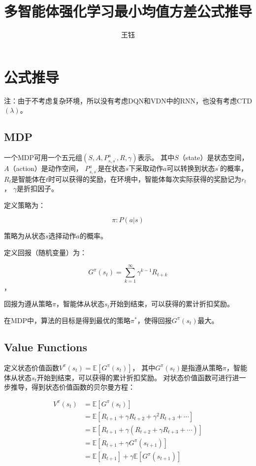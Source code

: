 \documentclass[UTF8]{ctexart}
\title{多智能体强化学习最小均值方差公式推导}
\begin{document}
\maketitle
\author{王钰}


\section{公式推导}

注：由于不考虑复杂环境，所以没有考虑DQN和VDN中的RNN，也没有考虑CTD$(\lambda)$。

\subsection{MDP}

一个MDP可用一个五元组$(S, A, P^a_{s, s^{\prime}}, R, \gamma)$表示。
其中$S$（state）是状态空间，$A$（action）是动作空间，
$P^a_{s, s^{\prime}}$是在状态$s$下采取动作$a$可以转换到状态$s^{\prime}$的概率，
$R_t$是智能体在$t$时可以获得的奖励，在环境中，智能体每次实际获得的奖励记为$r_t$，
$\gamma$是折扣因子。

定义策略为：

$$\pi:P(a|s)$$

策略为从状态$s$选择动作$a$的概率。

定义回报（随机变量）为：

$$G^{\pi}(s_t) = \sum_{k=1}^{\infty} \gamma^{k-1} R_{t+k}$$，

回报为遵从策略$\pi$，智能体从状态$s_t$开始到结束，可以获得的累计折扣奖励。

在MDP中，算法的目标是得到最优的策略$\pi^*$，使得回报$G^{\pi}(s_t)$最大。

\subsection{Value Functions}

定义状态价值函数$V^{\pi}(s_t) = \mathbb{E}[G^{\pi}(s_t)]$，
其中$G^{\pi}(s_t)$是指遵从策略$\pi$，智能体从状态$s_t$开始到结束，可以获得的累计折扣奖励。
对状态价值函数可进行进一步推导，得到状态价值函数的贝尔曼方程：

\begin{align*}
	V^{\pi}(s_t) &= \mathbb{E}[G^{\pi}(s_t)]  \\
	&= \mathbb{E}[R_{t+1} + \gamma R_{t+2} + \gamma^2 R_{t+3} + \cdots]  \\
	&= \mathbb{E}[R_{t+1} + \gamma (R_{t+2} + \gamma R_{t+3} + \cdots)]  \\
	&= \mathbb{E}[R_{t+1} + \gamma G^{\pi}(s_{t+1})] \\
	&= \mathbb{E}[R_{t+1}] + \gamma \mathbb{E}[G^{\pi}(s_{t+1})] \\
\end{align*}
\end{document}
